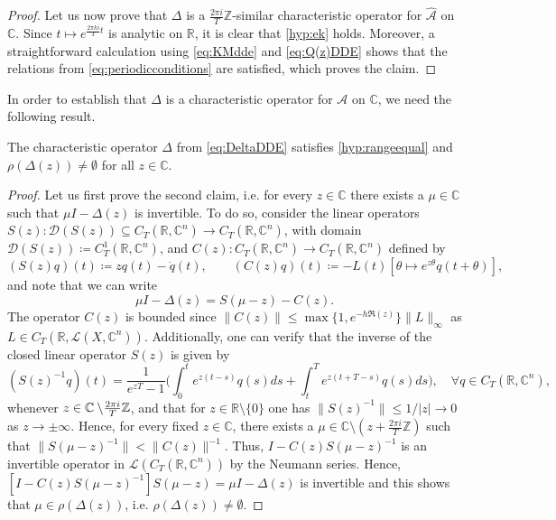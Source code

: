 \documentclass[english]{myarticle}
\begin{document}
\begin{sloppypar}
\begin{proof}
Let us now prove that $\Delta$ is a $\frac{2 \pi i}{T}\mathbb{Z}$-similar characteristic operator for $\hat{\mathcal{A}}$ on $\mathbb{C}$. Since $t \mapsto e^{\frac{2 \pi k i}{T}t}$ is analytic on $\mathbb{R}$, it is clear that \ref{hyp:ek} holds. Moreover, a straightforward calculation using \eqref{eq:KMdde} and \eqref{eq:Q(z)DDE} shows that the relations from \eqref{eq:periodicconditions} are satisfied, which proves the claim.
\end{proof}

In order to establish that $\Delta$ is a characteristic operator for $\mathcal{A}$ on $\mathbb{C}$, we need the following result.

\begin{lemma} \label{lemma:characinvertible}
The characteristic operator $\Delta$ from \eqref{eq:DeltaDDE} satisfies \ref{hyp:rangeequal} and $\rho(\Delta(z)) \neq \emptyset$ for all $z \in \mathbb{C}$.
\end{lemma}
\begin{proof}
Let us first prove the second claim, i.e. for every $z \in \mathbb{C}$ there exists a $\mu \in \mathbb{C}$ such that $\mu I - \Delta(z)$ is invertible. To do so, consider the linear operators $S(z) : \mathcal{D}(S(z)) \subseteq C_T(\mathbb{R},\mathbb{C}^n) \to C_T(\mathbb{R},\mathbb{C}^n)$, with domain $\mathcal{D}(S(z)) \coloneqq C_T^1(\mathbb{R},\mathbb{C}^n) $, and $C(z) : C_T(\mathbb{R},\mathbb{C}^n) \to C_T(\mathbb{R},\mathbb{C}^n)$ defined by 
\begin{equation} \label{eq:defn_S_C}
    (S(z)q)(t) \coloneqq z q(t) - \dot{q}(t), \qquad (C(z)q)(t) \coloneqq - L(t)[\theta \mapsto e^{z \theta}q(t+\theta)],
\end{equation}
and note that we can write
\begin{equation} \label{eq:mIDelta}
    \mu I - \Delta(z) = S(\mu - z) - C(z).
\end{equation}
The operator $C(z)$ is bounded since $\|C(z)\| \leq \max\{1,e^{-h \Re (z)} \} \|L\|_\infty$ as $L \in C_T(\mathbb{R},\mathcal{L}(X,\mathbb{C}^n))$. Additionally, one can verify that the inverse of the closed linear operator $S(z)$ is given by 
\begin{equation} \label{eq:S(z)inverse}
    (S(z)^{-1}q)(t) = \frac{1}{e^{z T}-1} \bigg( \int_0^t e^{z(t-s)}q(s) ds + \int_t^T e^{z(t+T-s)}q(s) ds\bigg), \quad \forall q \in C_T(\mathbb{R},\mathbb{C}^n),
\end{equation}
whenever $z \in \mathbb{C} \setminus \hspace{-2pt}\frac{2 \pi i }{T} \mathbb{Z}$, and that for $z \in \mathbb{R} \setminus \{0\}$ one has $\|S(z)^{-1}\| \leq 1/|z| \to 0$ as $z \to \pm \infty$. Hence, for every fixed $z \in \mathbb{C}$, there exists a $\mu \in \mathbb{C} \setminus (z + \frac{2 \pi i }{T} \mathbb{Z} )$ such that $\|S(\mu - z)^{-1}\| < \|C(z)\|^{-1}$. Thus, $I - C(z)S(\mu - z)^{-1}$ is an invertible operator in $\mathcal{L}(C_T(\mathbb{R},\mathbb{C}^n))$ by the Neumann series. Hence, $[I - C(z)S(\mu - z)^{-1}]S(\mu - z) = \mu I - \Delta(z)$ is invertible and this shows that $\mu \in \rho(\Delta(z))$, i.e. $\rho(\Delta(z)) \neq \emptyset$.


\end{proof}
\end{sloppypar}
\end{document}

